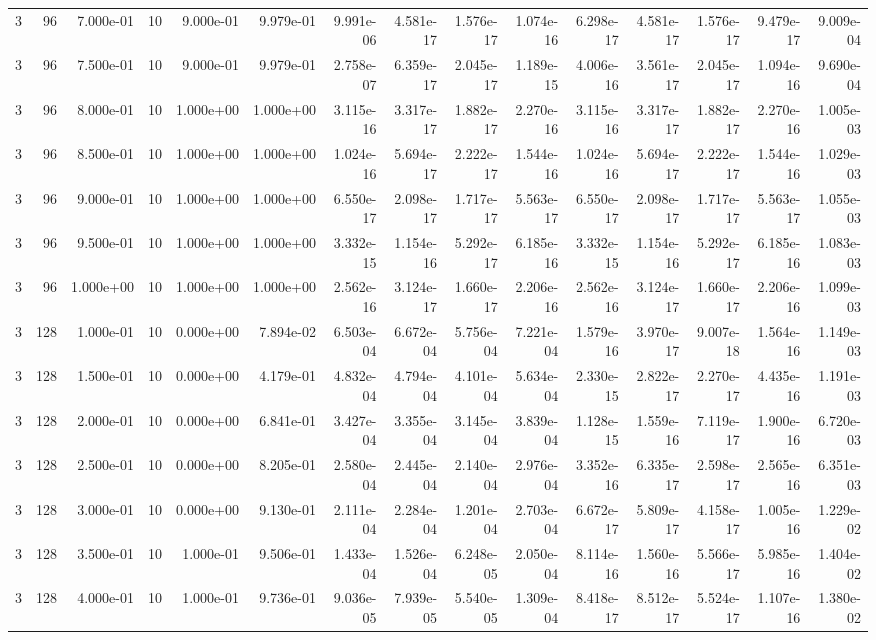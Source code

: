 \begin{tabular}{rrrrrrrrrrrrrrr}
3 & 96 & 7.000e-01 & 10 & 9.000e-01 & 9.979e-01 & 9.991e-06 & 4.581e-17 & 1.576e-17 & 1.074e-16 & 6.298e-17 & 4.581e-17 & 1.576e-17 & 9.479e-17 & 9.009e-04 \\
3 & 96 & 7.500e-01 & 10 & 9.000e-01 & 9.979e-01 & 2.758e-07 & 6.359e-17 & 2.045e-17 & 1.189e-15 & 4.006e-16 & 3.561e-17 & 2.045e-17 & 1.094e-16 & 9.690e-04 \\
3 & 96 & 8.000e-01 & 10 & 1.000e+00 & 1.000e+00 & 3.115e-16 & 3.317e-17 & 1.882e-17 & 2.270e-16 & 3.115e-16 & 3.317e-17 & 1.882e-17 & 2.270e-16 & 1.005e-03 \\
3 & 96 & 8.500e-01 & 10 & 1.000e+00 & 1.000e+00 & 1.024e-16 & 5.694e-17 & 2.222e-17 & 1.544e-16 & 1.024e-16 & 5.694e-17 & 2.222e-17 & 1.544e-16 & 1.029e-03 \\
3 & 96 & 9.000e-01 & 10 & 1.000e+00 & 1.000e+00 & 6.550e-17 & 2.098e-17 & 1.717e-17 & 5.563e-17 & 6.550e-17 & 2.098e-17 & 1.717e-17 & 5.563e-17 & 1.055e-03 \\
3 & 96 & 9.500e-01 & 10 & 1.000e+00 & 1.000e+00 & 3.332e-15 & 1.154e-16 & 5.292e-17 & 6.185e-16 & 3.332e-15 & 1.154e-16 & 5.292e-17 & 6.185e-16 & 1.083e-03 \\
3 & 96 & 1.000e+00 & 10 & 1.000e+00 & 1.000e+00 & 2.562e-16 & 3.124e-17 & 1.660e-17 & 2.206e-16 & 2.562e-16 & 3.124e-17 & 1.660e-17 & 2.206e-16 & 1.099e-03 \\
3 & 128 & 1.000e-01 & 10 & 0.000e+00 & 7.894e-02 & 6.503e-04 & 6.672e-04 & 5.756e-04 & 7.221e-04 & 1.579e-16 & 3.970e-17 & 9.007e-18 & 1.564e-16 & 1.149e-03 \\
3 & 128 & 1.500e-01 & 10 & 0.000e+00 & 4.179e-01 & 4.832e-04 & 4.794e-04 & 4.101e-04 & 5.634e-04 & 2.330e-15 & 2.822e-17 & 2.270e-17 & 4.435e-16 & 1.191e-03 \\
3 & 128 & 2.000e-01 & 10 & 0.000e+00 & 6.841e-01 & 3.427e-04 & 3.355e-04 & 3.145e-04 & 3.839e-04 & 1.128e-15 & 1.559e-16 & 7.119e-17 & 1.900e-16 & 6.720e-03 \\
3 & 128 & 2.500e-01 & 10 & 0.000e+00 & 8.205e-01 & 2.580e-04 & 2.445e-04 & 2.140e-04 & 2.976e-04 & 3.352e-16 & 6.335e-17 & 2.598e-17 & 2.565e-16 & 6.351e-03 \\
3 & 128 & 3.000e-01 & 10 & 0.000e+00 & 9.130e-01 & 2.111e-04 & 2.284e-04 & 1.201e-04 & 2.703e-04 & 6.672e-17 & 5.809e-17 & 4.158e-17 & 1.005e-16 & 1.229e-02 \\
3 & 128 & 3.500e-01 & 10 & 1.000e-01 & 9.506e-01 & 1.433e-04 & 1.526e-04 & 6.248e-05 & 2.050e-04 & 8.114e-16 & 1.560e-16 & 5.566e-17 & 5.985e-16 & 1.404e-02 \\
3 & 128 & 4.000e-01 & 10 & 1.000e-01 & 9.736e-01 & 9.036e-05 & 7.939e-05 & 5.540e-05 & 1.309e-04 & 8.418e-17 & 8.512e-17 & 5.524e-17 & 1.107e-16 & 1.380e-02 \\

\end{tabular}
